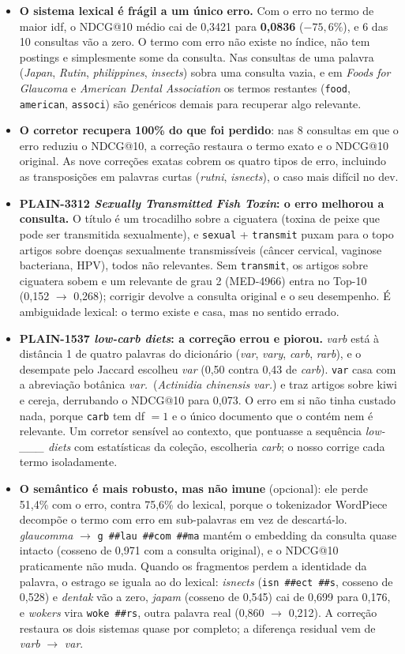 \documentclass[10pt,a4paper]{article}
\newcommand{\med}[1]{\mbox{MED-#1}}         %
\newcommand{\pq}[1]{\mbox{PLAIN-#1}}        %
\begin{document}
\begin{itemize}
\item \textbf{O sistema lexical é frágil a um único erro.} Com o erro no termo de maior idf, o NDCG@10 médio cai de 0,3421 para \textbf{0,0836} ($-75{,}6\%$), e 6 das 10 consultas vão a zero. O termo com erro não existe no índice, não tem postings e simplesmente some da consulta. Nas consultas de uma palavra (\emph{Japan}, \emph{Rutin}, \emph{philippines}, \emph{insects}) sobra uma consulta vazia, e em \emph{Foods for Glaucoma} e \emph{American Dental Association} os termos restantes (\texttt{food}, \texttt{american}, \texttt{associ}) são genéricos demais para recuperar algo relevante.
\item \textbf{O corretor recupera 100\% do que foi perdido}: nas 8 consultas em que o erro reduziu o NDCG@10, a correção restaura o termo exato e o NDCG@10 original. As nove correções exatas cobrem os quatro tipos de erro, incluindo as transposições em palavras curtas (\emph{rutni}, \emph{isnects}), o caso mais difícil no dev.
\item \textbf{\pq{3312} \emph{Sexually Transmitted Fish Toxin}: o erro melhorou a consulta.} O título é um trocadilho sobre a ciguatera (toxina de peixe que pode ser transmitida sexualmente), e \texttt{sexual} + \texttt{transmit} puxam para o topo artigos sobre doenças sexualmente transmissíveis (câncer cervical, vaginose bacteriana, HPV), todos não relevantes. Sem \texttt{transmit}, os artigos sobre ciguatera sobem e um relevante de grau 2 (\med{4966}) entra no Top-10 (0,152 $\to$ 0,268); corrigir devolve a consulta original e o seu desempenho. É ambiguidade lexical: o termo existe e casa, mas no sentido errado.
\item \textbf{\pq{1537} \emph{low-carb diets}: a correção errou e piorou.} \emph{varb} está à distância 1 de quatro palavras do dicionário (\emph{var}, \emph{vary}, \emph{carb}, \emph{rarb}), e o desempate pelo Jaccard escolheu \emph{var} (0,50 contra 0,43 de \emph{carb}). \texttt{var} casa com a abreviação botânica \emph{var.}\ (\emph{Actinidia chinensis var.}) e traz artigos sobre kiwi e cereja, derrubando o NDCG@10 para 0,073. O erro em si não tinha custado nada, porque \texttt{carb} tem df $= 1$ e o único documento que o contém nem é relevante. Um corretor sensível ao contexto, que pontuasse a sequência \emph{low-\_\_\_ diets} com estatísticas da coleção, escolheria \emph{carb}; o nosso corrige cada termo isoladamente.
\item \textbf{O semântico é mais robusto, mas não imune} (opcional): ele perde 51,4\% com o erro, contra 75,6\% do lexical, porque o tokenizador WordPiece decompõe o termo com erro em sub-palavras em vez de descartá-lo. \emph{glaucomma} $\to$ \texttt{g \#\#lau \#\#com \#\#ma} mantém o embedding da consulta quase intacto (cosseno de 0,971 com a consulta original), e o NDCG@10 praticamente não muda. Quando os fragmentos perdem a identidade da palavra, o estrago se iguala ao do lexical: \emph{isnects} (\texttt{isn \#\#ect \#\#s}, cosseno de 0,528) e \emph{dentak} vão a zero, \emph{japam} (cosseno de 0,545) cai de 0,699 para 0,176, e \emph{wokers} vira \texttt{woke \#\#rs}, outra palavra real (0,860 $\to$ 0,212). A correção restaura os dois sistemas quase por completo; a diferença residual vem de \emph{varb} $\to$ \emph{var}.

\end{itemize}
\end{document}
